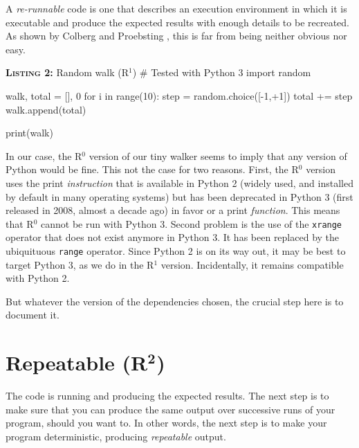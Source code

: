 \documentclass[a4paper,11pt]{article}
\begin{document}
A \emph{re-runnable} code is one that describes
an execution environment in which it is executable
and produce the expected results with enough details to be recreated.
As shown by Colberg and Proebsting \cite{Collberg:2016},
this is far from being neither obvious nor easy.

%
\begin{code}{\textbf{\textsc{Listing 2:}} Random walk (R$^1$)}
# Tested with Python 3
import random

walk, total = [], 0
for i in range(10):
    step = random.choice([-1,+1])     
    total += step
    walk.append(total)
    
print(walk)
\end{code}

In our case, the R$^0$ version of our tiny walker seems to imply
that any version of Python would be fine.
This not the case for two reasons.
First, the R$^0$ version uses the print {\em instruction}
that is available in Python 2 (widely used, and installed by default in many operating systems)
but has been deprecated in Python 3 (first released in 2008, almost a decade ago)
in favor or a  print {\em function}.
This means that R$^0$ cannot be run with Python 3.
Second problem is the use of the {\tt xrange} operator
that does not exist anymore in Python 3.
It has been replaced by the ubiquituous {\tt range} operator.
Since Python 2 is on its way out,
it may be best to target Python 3, as we do in the R$^1$ version.
Incidentally, it remains compatible with Python 2.

But whatever the version of the dependencies chosen,
the crucial step here is to document it.


\clearpage
\section*{Repeatable (R$^{\mathbf 2}$)}

% 
% 
% 

The code is running and producing the expected results. 
The next step is to make sure that you can produce the same output over successive runs of your program, 
should you want to. 
In other words, the next step is to make your program deterministic, 
producing {\em repeatable} output. 
\end{document}
